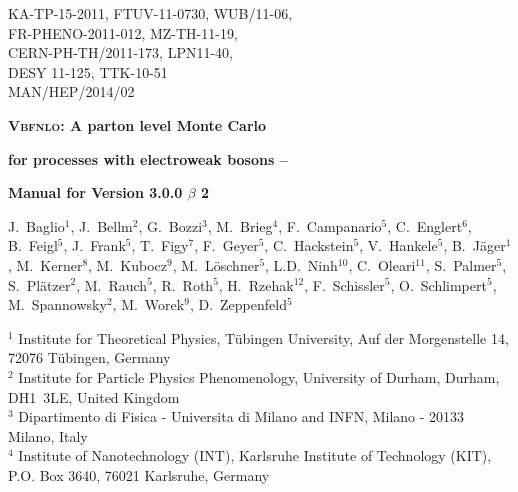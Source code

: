\documentclass[english,12pt]{article}
\begin{document}
\begin{titlepage}
{\begin{flushright}{
 \begin{minipage}{8.5cm}
  KA-TP-15-2011,  FTUV-11-0730,  WUB/11-06, \\ 
  FR-PHENO-2011-012,  MZ-TH-11-19, \\ 
  CERN-PH-TH/2011-173,  LPN11-40, \\ 
  DESY 11-125,  TTK-10-51 \\
  MAN/HEP/2014/02
\end{minipage}}\end{flushright}}
\vspace{1cm}
\begin{center} {\Large \bf \textsc{Vbfnlo}: A parton level Monte Carlo
    } 
\end{center}
\begin{center}
 {\Large \bf  for processes with electroweak bosons --}
\end{center}
\begin{center}
 {\Large \bf  Manual for Version 3.0.0 $\beta$ 2}
\end{center}
\vspace{0.6cm}
\begin{center}
{\renewcommand{\baselinestretch}{4}
J.~Baglio$^{1}$, J.~Bellm$^{2}$, G.~Bozzi$^{3}$,
M.~Brieg$^{4}$, F.~Campanario$^{5}$, C.~Englert$^{6}$, B.~Feigl$^{5}$,
J.~Frank$^{5}$, T.~Figy$^{7}$, F.~Geyer$^{5}$, C.~Hackstein$^{5}$,
V.~Hankele$^{5}$, B.~J\"ager$^{1}$, M.~Kerner$^{8}$,
M.~Kubocz$^{9}$, M.~L\"oschner$^{5}$,
L.D.~Ninh$^{10}$, C.~Oleari$^{11}$, S.~Palmer$^{5}$,
S.~Pl\"atzer$^{2}$, M.~Rauch$^{5}$, R.~Roth$^{5}$, H.~Rzehak$^{12}$,
F.~Schissler$^{5}$, O.~Schlimpert$^{5}$, M.~Spannowsky$^{2}$,
M.~Worek$^{9}$, D.~Zeppenfeld$^{5}$
}
\end{center}
\vspace{0.4cm}
\begin{center}
$^{1}$ Institute for Theoretical Physics, T\"{u}bingen University, Auf der Morgenstelle 14, 72076 T\"{u}bingen, Germany \\ \noindent
$^{2}$ Institute for Particle Physics Phenomenology, University of Durham, Durham, DH1~3LE, United Kingdom \\ \noindent
$^{3}$ Dipartimento di Fisica - Universita di Milano and INFN, Milano - 20133 Milano, Italy\\ \noindent
$^{4}$ Institute of Nanotechnology (INT), Karlsruhe Institute of Technology (KIT), P.O. Box 3640, 76021 Karlsruhe, Germany \\ \noindent

\end{center}
\end{titlepage}
\end{document}
